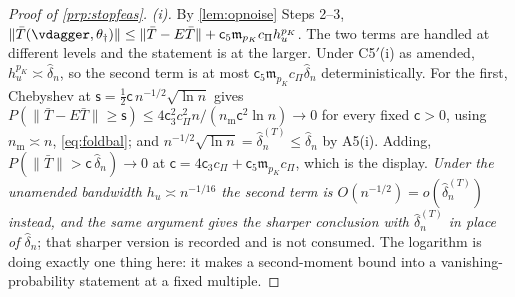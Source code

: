 \begin{proof}[Proof of \cref{prp:stopfeas}]
\emph{(i).} By \cref{lem:opnoise} Steps 2--3,
$\|\bar T(\vdagger,\theta_\dagger)\|\le\|\bar T-E\bar T\|+\mathsf c_5\mathfrak m_{p_K}c_\Pi h_u^{p_K}$.
The two terms are handled at different levels and the statement is at the larger. Under
C5$'$(i) as amended, $h_u^{p_K}\asymp\hat\delta_n$, so the second term is at most
$\mathsf c_5\mathfrak m_{p_K}c_\Pi\hat\delta_n$ deterministically. For the first, Chebyshev at
$\mathsf s=\tfrac12\mathsf c\,n^{-1/2}\sqrt{\ln n}$ gives
$P(\|\bar T-E\bar T\|\ge\mathsf s)\le 4\mathsf c_3^{2}c_\Pi^{2}n/(n_{\mathrm m}\mathsf c^{2}\ln n)\to0$ for
every fixed $\mathsf c>0$, using $n_{\mathrm m}\asymp n$, \eqref{eq:foldbal}; and
$n^{-1/2}\sqrt{\ln n}=\hat\delta_n^{(T)}\le\hat\delta_n$ by A5(i). Adding,
$P(\|\bar T\|>\mathsf c\,\hat\delta_n)\to0$ at
$\mathsf c=4\mathsf c_3c_\Pi+\mathsf c_5\mathfrak m_{p_K}c_\Pi$,
which is the display.
\emph{Under the unamended bandwidth $h_u\asymp n^{-1/16}$ the second term is
$O(n^{-1/2})=o(\hat\delta_n^{(T)})$ instead, and the same argument gives the sharper conclusion with
$\hat\delta_n^{(T)}$ in place of $\hat\delta_n$}; that sharper version is recorded and is not consumed.
The logarithm is doing exactly one thing here: it makes a second-moment bound into a
vanishing-probability statement at a fixed multiple.


\end{proof}
